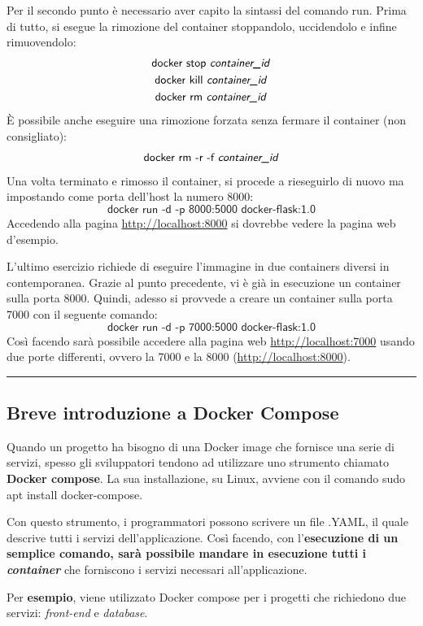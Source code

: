 \documentclass[a4paper]{article}
\newcommand{\longline}{\noindent\rule{\textwidth}{0.4pt}}
\begin{document}
	\noindent
	Per il secondo punto è necessario aver capito la sintassi del comando \textsf{run}. Prima di tutto, si esegue la rimozione del container stoppandolo, uccidendolo e infine rimuovendolo:
	\begin{gather*}
		\textsf{docker stop \emph{container\_id}} \\
		\textsf{docker kill \emph{container\_id}} \\
		\textsf{docker rm \emph{container\_id}}
	\end{gather*}
	È possibile anche eseguire una rimozione forzata senza fermare il container (non consigliato):
	\begin{equation*}
		\textsf{docker rm -r -f \emph{container\_id}}
	\end{equation*}
	Una volta terminato e rimosso il container, si procede a rieseguirlo di nuovo ma impostando come porta dell'host la numero 8000:
	\begin{equation*}
		\textsf{docker run -d -p 8000:5000 docker-flask:1.0}
	\end{equation*}
	Accedendo alla pagina \url{http://localhost:8000} si dovrebbe vedere la pagina web d'esempio.\newline
	
	\noindent
	L'ultimo esercizio richiede di eseguire l'immagine in due containers diversi in contemporanea. Grazie al punto precedente, vi è già in esecuzione un container sulla porta 8000. Quindi, adesso si provvede a creare un container sulla porta 7000 con il seguente comando:
	\begin{equation*}
		\textsf{docker run -d -p 7000:5000 docker-flask:1.0}
	\end{equation*}
	Così facendo sarà possibile accedere alla pagina web \url{http://localhost:7000} usando due porte differenti, ovvero la 7000 e la 8000 (\url{http://localhost:8000}).
	
	\longline
	
	\subsection{Breve introduzione a Docker Compose}
	
	Quando un progetto ha bisogno di una Docker image che fornisce una serie di servizi, spesso gli sviluppatori tendono ad utilizzare uno strumento chiamato \textcolor{Red3}{\textbf{Docker compose}}. La sua installazione, su Linux, avviene con il comando \textsf{sudo apt install docker-compose}.\newline
	
	\noindent
	Con questo strumento, i programmatori possono scrivere un file .YAML, il quale descrive tutti i servizi dell'applicazione. Così facendo, con l'\textbf{esecuzione di un semplice comando, sarà possibile mandare in esecuzione tutti i \emph{container}} che forniscono i servizi necessari all'applicazione. 
	
	Per \textcolor{Green4}{\textbf{esempio}}, viene utilizzato Docker compose per i progetti che richiedono due servizi: \emph{front-end} e \emph{database}.
\end{document}
